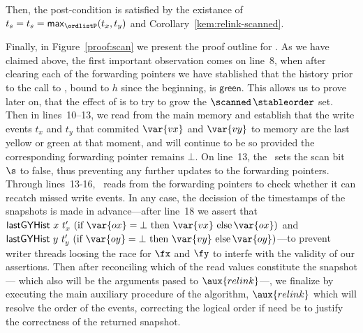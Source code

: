 Then, the post-condition is satisfied by the existance of $t_s = t_s =
\mathsf{max}_{\ordlistP} (t_x,t_y)$ and
Corollary~\ref{kem:relink-scanned}.

Finally, in Figure~\ref{proof:scan} we present the proof outline for
\jyscan. As we have claimed above, the first important observation
comes on line~8, when after clearing each of the forwarding pointers
we have stablished that the history prior to the call to \jyscan,
bound to $h$ since the beginning, is $\mathsf{green}$. This allows us
to prove later on, that the effect of \jyscan is to try to grow the
$\scanned\, \stableorder$ set. Then in lines~10--13, we read from the
main memory and establish that the write events $t_x$ and $t_y$ that
commited $\var{vx}$ and $\var{vy}$ to memory are the last yellow or
green at that moment, and will continue to be so provided the
corresponding forwarding pointer remains $\bot$. On line~13, the
\jyscan\ sets the scan bit $\s$ to false, thus preventing any further
updates to the forwarding pointers. Through lines~13-16,
\jyscan\ reads from the forwarding pointers to check whether it can
recatch missed write events. In any case, the decission of the
timestamps of the snapshots is made in advance---after line~18 we
assert that $\histLGY\ x\ t'_x\ (\textrm{if}\ \var{ox} =
\bot\ \textrm{then}\ \var{vx}\ \textrm{else}\, \var{ox})$ and
$\histLGY\ y\ t'_y\ (\textrm{if}\ \var{oy} =
\bot\ \textrm{then}\ \var{vy}\ \textrm{else}\, \var{oy})$---to prevent
writer threads loosing the race for $\fx$ and $\fy$ to interfe with
the validity of our assertions. Then after reconciling which of the
read values constitute the snapshot--- which also will be the
arguments pased to $\aux{relink}$---, we finalize by executing the
main auxiliary procedure of the algorithm, $\aux{relink}$ which will
resolve the order of the events, correcting the logical order if need
be to justify the correctness of the returned snapshot.


